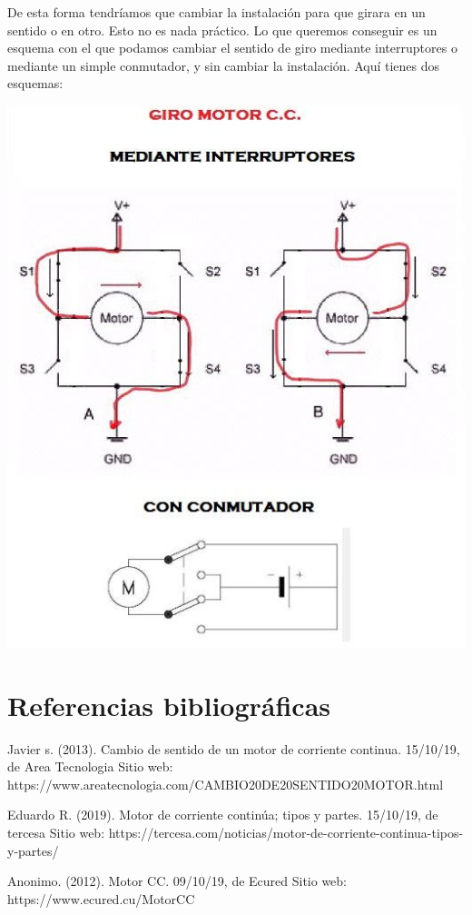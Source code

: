 \documentclass[12pt,a4paper]{article}
\begin{document}
\begin{flushleft}
\begin{flushleft}
De esta forma tendríamos que cambiar la instalación para que girara en un sentido o en otro. Esto no es nada práctico. Lo que queremos conseguir es un esquema con el que podamos cambiar el sentido de giro mediante interruptores o mediante un simple conmutador, y sin cambiar la instalación. Aquí tienes dos esquemas:
\begin{center}
\includegraphics[scale=.5]{imagenes/sw.JPG}
\end{center}
\end{flushleft}{}

\section{Referencias bibliográficas}
\begin{flushleft}
Javier s. (2013). Cambio de sentido de un motor de corriente continua. 15/10/19, de Area Tecnologia Sitio web: https://www.areatecnologia.com/CAMBIO20DE20SENTIDO20MOTOR.html \linebreak


Eduardo R. (2019). Motor de corriente continúa; tipos y partes. 15/10/19, de tercesa Sitio web: https://tercesa.com/noticias/motor-de-corriente-continua-tipos-y-partes/\linebreak

Anonimo. (2012). Motor CC. 09/10/19, de Ecured Sitio web: https://www.ecured.cu/MotorCC

\end{flushleft}
\end{flushleft}
\end{document}
